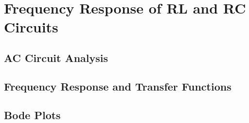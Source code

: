 \chapter{Frequency Response of RL and RC Circuits}
\label{cha:freq_response_rlc}
    \section{AC Circuit Analysis}
    \section{Frequency Response and Transfer Functions}
    \section{Bode Plots}